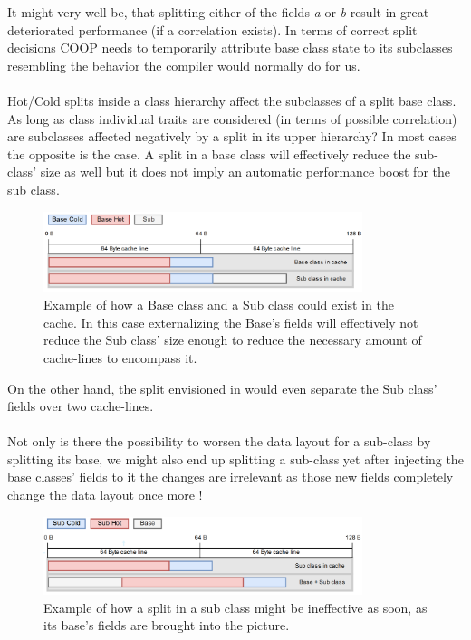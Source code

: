 It might very well be, that splitting either of the fields \textit{a} or \textit{b} result in great deteriorated performance (if a correlation exists). In terms of correct split decisions COOP needs to temporarily attribute base class state to its subclasses resembling the behavior the compiler would normally do for us.\\\\
Hot/Cold splits inside a class hierarchy affect the subclasses of a split base class. As long as class individual traits are considered (in terms of possible correlation) are subclasses affected negatively by a split in its upper hierarchy? In most cases the opposite is the case. A split in a base class will effectively reduce the sub-class' size as well but it does not imply an automatic performance boost for the sub class.
\begin{figure}[!htbp]
	\centering
	\includegraphics[width=0.83\textwidth,height=0.25\textwidth]{PICs/inheritance_split}
	\caption{Example of how a Base class and a Sub class could exist in the cache. In this case externalizing the Base's fields will effectively not reduce the Sub class' size enough to reduce the necessary amount of cache-lines to encompass it.}
	\label{inheritance_split}
\end{figure}
On the other hand, the split envisioned in  would even separate the Sub class' fields over two cache-lines.\\\\
Not only is there the possibility to worsen the data layout for a sub-class by splitting its base, we might also end up splitting a sub-class yet after injecting the base classes' fields to it the changes are irrelevant as those new fields completely change the data layout once more !
\begin{figure}[!htbp]
	\centering
	\includegraphics[width=0.83\textwidth,height=0.25\textwidth]{PICs/inheritance_split_2}
	\caption{Example of how a split in a sub class might be ineffective as soon, as its base's fields are brought into the picture.}
	\label{inheritance_split_2}
\end{figure}
